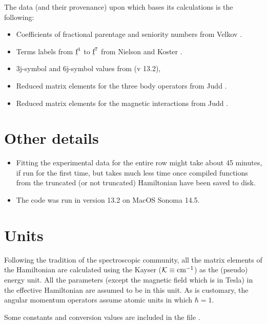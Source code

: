 \documentclass[11pt, twoside,openright]{article}
\begin{document}
	The data (and their provenance) upon which \qlanth bases its calculations is the following:
	
	\begin{itemize} 
		\item Coefficients of fractional parentage and seniority numbers from Velkov \cite{velkov_multi-electron_2000}.
		\item Terms labels from $\underbar{\text{f}}^1$ to $\underbar{\text{f}}^7$ from Nielson and Koster \cite{nielson_spectroscopic_1963}.
		\item 3j-symbol \cite{wolfram_research_threejsymbol_2024} and 6j-symbol \cite{wolfram_research_sixjsymbol_2024} values from \mathematica (v 13.2),
		\item Reduced matrix elements for the three body operators from Judd \cite{judd_complete_1984}.
		\item Reduced matrix elements for the magnetic interactions from Judd \cite{judd_intra-atomic_1968}. 
	\end{itemize}

\section{Other details}\label{section:other-details}

	\begin{itemize}
		\item Fitting the experimental data for the entire row might take about 45 minutes, if run for the first time, but takes much less time once compiled functions from the truncated (or not truncated) Hamiltonian have been saved to disk.
		\item The code was run in \mathematica version 13.2 on MacOS Sonoma 14.5.
	\end{itemize}


\section{Units}\label{section:units}

Following the tradition of the spectroscopic community, all the matrix elements of the Hamiltonian are calculated using the Kayser ($\mathcal{K} \equiv \text{cm}^{-1}$) as the (pseudo) energy unit. All the parameters (except the magnetic field which is in Tesla) in the effective Hamiltonian are assumed to be in this unit. As is customary, the angular momentum operators assume atomic units in which $\hbar=1$.

Some constants and conversion values are included in the file .
\end{document}
